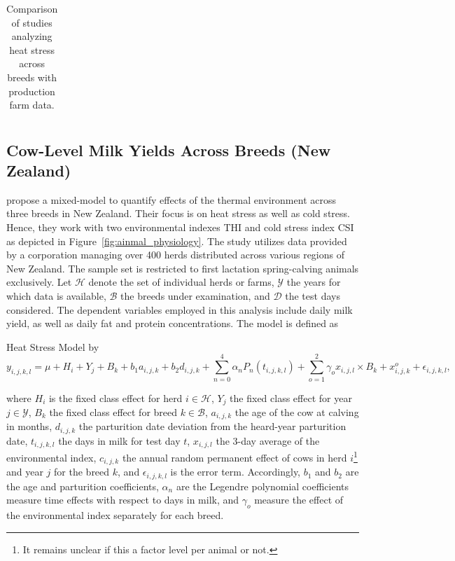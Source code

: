 \begin{table}[H]
\begin{tabular}{ccrrrcc}
        \hline
        \end{tabular}\label{table:study_comparison}
        \caption{Comparison of studies analyzing heat stress across breeds with production farm data.}
        \label{table:breed_study_comparison}
\end{table}

\subsection{Cow-Level Milk Yields Across Breeds (New Zealand)}\label{sec:new_zealand}
\cite{bryant_quantifying_2007} propose a mixed-model to quantify effects of the thermal environment across three breeds in New Zealand. Their focus is on heat stress as well as cold stress. Hence, they work with two environmental indexes THI and cold stress index CSI as depicted in Figure~\ref{fig:ainmal_physiology}. The study utilizes data provided by a corporation managing over 400 herds distributed across various regions of New Zealand. The sample set is restricted to first lactation spring-calving animals exclusively. Let $\mathcal{H}$ denote the set of individual herds or farms, $\mathcal{Y}$ the years for which data is available, $\mathcal{B}$ the breeds under examination, and $\mathcal{D}$ the test days considered. The dependent variables employed in this analysis include daily milk yield, as well as daily fat and protein concentrations. The model is defined as

\begin{defi} Heat Stress Model by \cite{bryant_quantifying_2007}
    \begin{equation}
    y_{i,j,k,l} = \mu + H_i + Y_j + B_k + b_1 a_{i,j,k} + b_2 d_{i,j,k} + \sum_{n=0}^{4} \alpha_n P_n(t_{i,j,k,l}) + \sum_{o=1}^2 \gamma_o x_{i,j,l} \times B_k + x_{i,j,k}^o + \epsilon_{i,j,k,l},
\end{equation}
\end{defi}
 where $H_i$ is the fixed class effect for herd $i \in \mathcal{H}$, $Y_j$ the fixed class effect for year $j \in \mathcal{Y}$, $B_k$ the fixed class effect for breed $k \in \mathcal{B}$, $a_{i,j,k}$ the age of the cow at calving in months, $d_{i,j,k}$ the parturition date deviation from the heard-year parturition date, $t_{i,j,k,l}$ the days in milk for test day $t$, $x_{i,j,l}$ the 3-day average of the environmental index, $c_{i,j,k}$ the annual random permanent effect of cows in herd $i$\footnote{It remains unclear if this a factor level per animal or not.} and year $j$ for the breed $k$, and $\epsilon_{i,j,k,l}$ is the error term. Accordingly, $b_1$ and $b_2$ are the age and parturition coefficients, $\alpha_n$ are the Legendre polynomial coefficients measure time effects with respect to days in milk, and $\gamma_o$ measure the effect of the environmental index separately for each breed.

